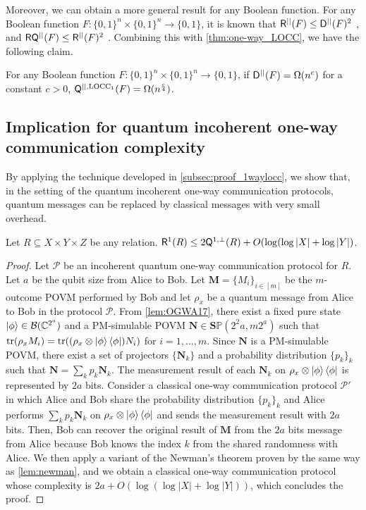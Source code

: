 Moreover, we can obtain a more general result for any Boolean function. For any Boolean function $F:\{0,1\}^n \times \{0,1\}^n \rightarrow \{0,1\}$, it is known that $\mathsf{R}^{||}(F) \leq \mathsf{D}^{||}(F)^2$ \cite{BK97}, and $\mathsf{R}\mathsf{Q}^{||}(F) \leq \mathsf{R}^{||}(F)^2$ \cite{GRdW08}. Combining this with \cref{thm:one-way_LOCC}, we have the following claim.

\begin{corollary}\label{cor:quartic}
    For any Boolean function $F:\{0,1\}^n \times \{0,1\}^n \rightarrow \{0,1\}$, if $\mathsf{D}^{||}(F) = \Omega(n^c)$ for a constant $c > 0$, $\mathsf{Q}^{||,\mathrm{LOCC_1}} (F) = \Omega(n^{\frac{c}{4}})$.
\end{corollary}

\subsection{Implication for quantum incoherent one-way communication complexity}

By applying the technique developed in \cref{subsec:proof_1waylocc}, we show that, in the setting of the quantum incoherent one-way communication protocols, quantum messages can be replaced by classical messages with very small overhead.
\begin{corollary}\label{cor:incoherent}
    Let $R \subseteq X \times Y \times Z$ be any relation. $\mathsf{R}^1(R) \leq 2 \mathsf{Q}^{1,\perp}(R) + O(\log (\log |X| + \log |Y|)$.
\end{corollary}
\begin{proof}
    Let $\mathcal{P}$ be an incoherent quantum one-way communication protocol for $R$. Let $a$ be the qubit size from Alice to Bob. Let $\mathbf{M} = \{M_i\}_{i \in [m]}$ be the $m$-outcome POVM performed by Bob and let $\rho_x$ be a quantum message from Alice to Bob in the protocol $\mathcal{P}$. From \cref{lem:OGWA17}, there exist a fixed pure state $\ket{\phi} \in \mathcal{B}(\mathbb{C}^{2^a})$ and a PM-simulable POVM $\mathbf{N} \in \mathbf{S}\mathbb{P}(2^2a,m2^a)$ such that $\mathrm{tr}(\rho_x M_i) = \mathrm{tr}((\rho_x \otimes \ket{\phi} \bra{\phi}) N_i)$ for $i=1,\ldots,m$. Since $\mathbf{N}$ is a PM-simulable POVM, there exist a set of projectors $\{\mathbf{N}_k\}$ and a probability distribution $\{p_k\}_k$ such that $\mathbf{N} = \sum_k p_k \mathbf{N}_k$. The measurement result of each $\mathbf{N}_k$ on $\rho_x \otimes \ket{\phi} \bra{\phi}$ is represented by $2a$ bits. Consider a classical one-way communication protocol $\mathcal{P}'$ in which Alice and Bob share the probability distribution $\{p_k\}_k$ and Alice performs $\sum_k p_k \mathbf{N}_k$ on $\rho_x \otimes \ket{\phi}\bra{\phi}$ and sends the measurement result with $2a$ bits. Then, Bob can recover the original result of $\mathbf{M}$ from the $2a$ bits message from Alice because Bob knows the index $k$ from the shared randomness with Alice.
    We then apply a variant of the Newman's theorem proven by the same way as \cref{lem:newman}, and we obtain a classical one-way communication protocol whose complexity is $2a + O(\log (\log |X| + \log |Y|))$, which concludes the proof.
\end{proof}